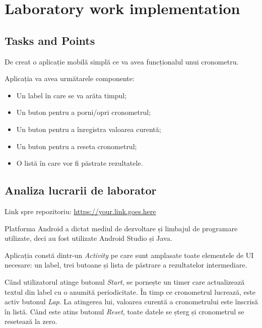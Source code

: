 \section{Laboratory work implementation}

\subsection{Tasks and Points}

\par De creat o aplicație mobilă simplă ce va avea funcționalul unui cronometru.

\par Aplicația va avea următarele componente:
\begin{itemize}
 \item Un label în care se va arăta timpul;
 \item Un buton pentru a porni/opri cronometrul;
 \item Un buton pentru a înregistra valoarea curentă;
 \item Un buton pentru a reseta cronometrul;
 \item O listă în care vor fi păstrate rezultatele.
\end{itemize}

\subsection{Analiza lucrarii de laborator}

\par Link spre repozitoriu: \url{https://your.link.goes.here}

\par Platforma Android\cite{android} a dictat mediul de dezvoltare și limbajul de programare utilizate, deci au fost utilizate Android Studio\cite{studio} și Java. 

\par Aplicația constă dintr-un \textit{Activity} pe care sunt amplasate toate elementele de UI necesare: un label, trei butoane și lista de păstrare a rezultatelor intermediare.

\par Când utilizatorul atinge butonul \textit{Start}, se pornește un timer care actualizează textul din label cu o anumită periodicitate. În timp ce cronometrul lucrează, este activ butonul \textit{Lap}. La atingerea lui, valoarea curentă a cronometrului este înscrisă în listă. Când este atins butonul \textit{Reset}, toate datele se șterg și cronometrul se resetează la zero. 



